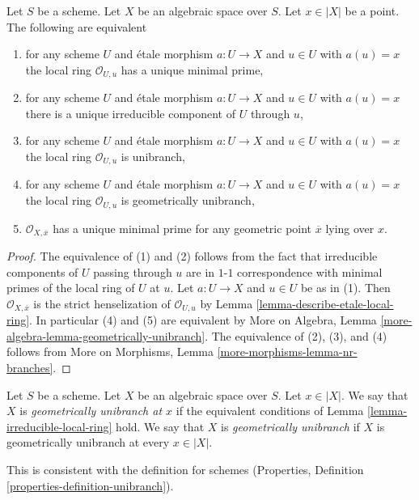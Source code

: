 \begin{lemma}
\label{lemma-irreducible-local-ring}
Let $S$ be a scheme.
Let $X$ be an algebraic space over $S$.
Let $x \in |X|$ be a point.
The following are equivalent
\begin{enumerate}
\item for any scheme $U$ and \'etale morphism $a : U \to X$ and
$u \in U$ with $a(u) = x$ the local ring $\mathcal{O}_{U, u}$ has a
unique minimal prime,
\item for any scheme $U$ and \'etale morphism $a : U \to X$ and
$u \in U$ with $a(u) = x$ there is a unique irreducible component of $U$
through $u$,
\item for any scheme $U$ and \'etale morphism $a : U \to X$ and
$u \in U$ with $a(u) = x$ the local ring $\mathcal{O}_{U, u}$
is unibranch,
\item for any scheme $U$ and \'etale morphism $a : U \to X$ and
$u \in U$ with $a(u) = x$ the local ring $\mathcal{O}_{U, u}$
is geometrically unibranch,
\item $\mathcal{O}_{X, \overline{x}}$ has a unique minimal prime
for any geometric point $\overline{x}$ lying over $x$.
\end{enumerate}
\end{lemma}

\begin{proof}
The equivalence of (1) and (2) follows from the fact that irreducible
components of $U$ passing through $u$ are in $1$-$1$ correspondence with
minimal primes of the local ring of $U$ at $u$. Let $a : U \to X$ and
$u \in U$ be as in (1). Then $\mathcal{O}_{X, \overline{x}}$ is
the strict henselization of $\mathcal{O}_{U, u}$ by
Lemma \ref{lemma-describe-etale-local-ring}.
In particular (4) and (5) are equivalent by
More on Algebra, Lemma \ref{more-algebra-lemma-geometrically-unibranch}.
The equivalence of (2), (3), and (4) follows from
More on Morphisms, Lemma \ref{more-morphisms-lemma-nr-branches}.
\end{proof}

\begin{definition}
\label{definition-unibranch}
Let $S$ be a scheme. Let $X$ be an algebraic space over $S$.
Let $x \in |X|$. We say that $X$ is {\it geometrically unibranch
at $x$} if the equivalent conditions of
Lemma \ref{lemma-irreducible-local-ring}
hold. We say that $X$ is {\it geometrically unibranch} if $X$ is
geometrically unibranch at every $x \in |X|$.
\end{definition}

\noindent
This is consistent with the definition for schemes
(Properties, Definition \ref{properties-definition-unibranch}).

